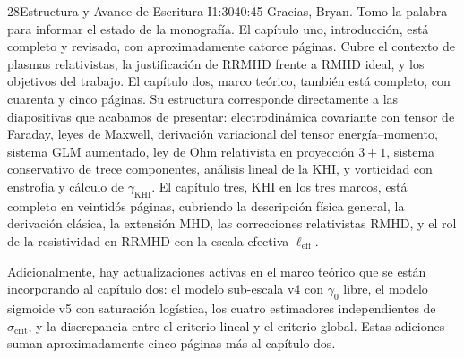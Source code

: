 \documentclass[11pt,a4paper]{article}
\begin{document}
\begin{seborador}{28}{Estructura y Avance de Escritura I}{1:30}{40:45}
Gracias, Bryan. Tomo la palabra para informar el estado de la monografía. El
capítulo uno, introducción, está completo y revisado, con aproximadamente
catorce páginas. Cubre el contexto de plasmas relativistas, la justificación
de RRMHD frente a RMHD ideal, y los objetivos del trabajo. El capítulo dos,
marco teórico, también está completo, con cuarenta y cinco páginas. Su
estructura corresponde directamente a las diapositivas que acabamos de
presentar: electrodinámica covariante con tensor de Faraday, leyes de
Maxwell, derivación variacional del tensor energía--momento, sistema GLM
aumentado, ley de Ohm relativista en proyección $3+1$, sistema conservativo
de trece componentes, análisis lineal de la KHI, y vorticidad con enstrofía
y cálculo de $\gamma_\text{KHI}$. El capítulo tres, KHI en los tres marcos,
está completo en veintidós páginas, cubriendo la descripción física general,
la derivación clásica, la extensión MHD, las correcciones relativistas RMHD,
y el rol de la resistividad en RRMHD con la escala efectiva $\ell_\text{eff}$.

Adicionalmente, hay actualizaciones activas en el marco teórico que se están
incorporando al capítulo dos: el modelo sub-escala v4 con $\gamma_0$ libre,
el modelo sigmoide v5 con saturación logística, los cuatro estimadores
independientes de $\sigma_\text{crit}$, y la discrepancia entre el criterio
lineal y el criterio global. Estas adiciones suman aproximadamente cinco
páginas más al capítulo dos.
\end{seborador}
\end{document}
